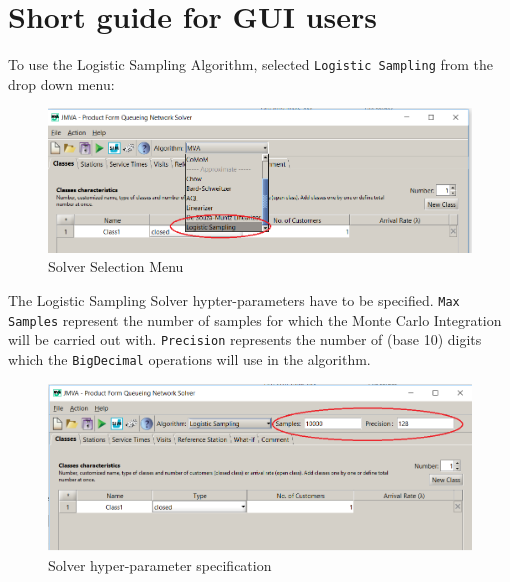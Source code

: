 \newpage

\section{Short guide for GUI users}

To use the Logistic Sampling Algorithm, selected \texttt{Logistic Sampling} from the drop down menu:
\begin{figure}[H]
\centering
\includegraphics[width=1.\textwidth]{figures/LogisticSampling_GUI_selection.png}
\caption{ Solver Selection Menu }
\label{fig:LogisticSampling_GUI_selection}
\end{figure}

The Logistic Sampling Solver hypter-parameters have to be specified. \texttt{Max Samples} represent the number of samples for which the Monte Carlo Integration will be carried out with. \texttt{Precision} represents the number of (base 10) digits which the \texttt{BigDecimal} operations will use in the algorithm.

\begin{figure}[H]
\centering
\includegraphics[width=1.\textwidth]{figures/LogisticSampling_GUI_hyperparams.png}
\caption{ Solver hyper-parameter specification }
\label{fig:LogisticSampling_GUI_hyperparams}
\end{figure}

